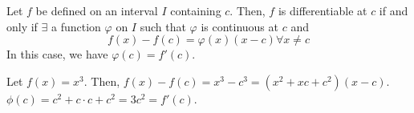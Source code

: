 \begin{theorem}
    Let $f$ be defined on an interval $I$ containing $c$. Then, $f$ is differentiable at $c$ if and only if $\exists$ a function $\varphi$ on $I$ such that $\varphi$ is continuous at $c$ and $$f(x) - f(c) = \varphi(x)(x - c) \forall x \neq c$$ In this case, we have $\varphi(c) = f'(c)$.
\end{theorem}
\begin{remark}
    Let $f(x) = x^3$. Then, $f(x) - f(c) = x^3 - c^3 = (x^2 + xc + c^2)(x - c)$. $\phi(c) = c^2 + c \cdot c + c^2 = 3c^2 = f'(c)$.
\end{remark}